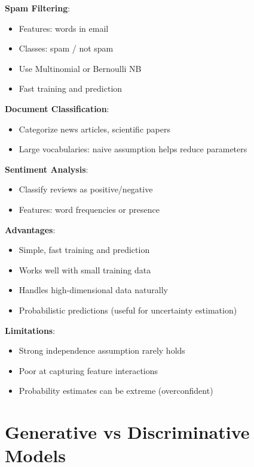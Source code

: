 \documentclass[11pt,twoside]{article}
\numberwithin{equation}{section}
\theoremstyle{plain}
\theoremstyle{definition}
\theoremstyle{remark}
\newenvironment{keyidea}{
  \begin{tcolorbox}[colback=yellow!5!white,
                    colframe=yellow!50!black,
                    title=Key Idea,
                    breakable,
                    enhanced,
                    sharp corners,
                    boxrule=0.8pt,
                    left=6pt, right=6pt, top=6pt, bottom=6pt]
}{
  \end{tcolorbox}
}
\begin{document}
\begin{keyidea}
\textbf{Spam Filtering}:
\begin{itemize}
\item Features: words in email
\item Classes: spam / not spam
\item Use Multinomial or Bernoulli NB
\item Fast training and prediction
\end{itemize}

\textbf{Document Classification}:
\begin{itemize}
\item Categorize news articles, scientific papers
\item Large vocabularies: naive assumption helps reduce parameters
\end{itemize}

\textbf{Sentiment Analysis}:
\begin{itemize}
\item Classify reviews as positive/negative
\item Features: word frequencies or presence
\end{itemize}

\textbf{Advantages}:
\begin{itemize}
\item Simple, fast training and prediction
\item Works well with small training data
\item Handles high-dimensional data naturally
\item Probabilistic predictions (useful for uncertainty estimation)
\end{itemize}

\textbf{Limitations}:
\begin{itemize}
\item Strong independence assumption rarely holds
\item Poor at capturing feature interactions
\item Probability estimates can be extreme (overconfident)
\end{itemize}
\end{keyidea}

\section{Generative vs Discriminative Models}
\label{sec:generative-discriminative}
\end{document}
